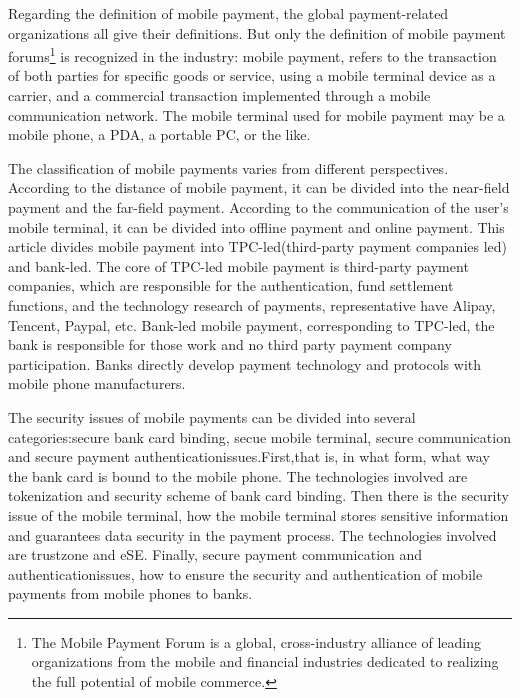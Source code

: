 \documentclass[journal]{IEEEtran}
\begin{document}
Regarding the definition of mobile payment, the global payment-related organizations all give their definitions. But only the definition of mobile payment forums\footnote{The Mobile Payment Forum is a global, cross-industry alliance of leading organizations from the mobile and financial industries dedicated to realizing the full potential of mobile commerce.} is recognized in the industry: mobile payment, refers to the transaction of both parties for specific goods or service, using a mobile terminal device as a carrier, and a commercial transaction implemented through a mobile communication network. The mobile terminal used for mobile payment may be a mobile phone, a PDA, a portable PC, or the like.

The classification of mobile payments varies from different perspectives. According to the distance of mobile payment, it can be divided into the near-field payment and the far-field payment. According to the communication of the user's mobile terminal, it can be divided into offline payment and online payment. This article divides mobile payment into TPC-led(third-party payment companies led) and bank-led. The core of TPC-led mobile payment is third-party payment companies, which are responsible for the authentication, fund settlement functions, and the technology research of payments, representative have Alipay, Tencent, Paypal, etc. Bank-led mobile payment, corresponding to TPC-led, the bank is responsible for those work and no third party payment company participation. Banks directly develop payment technology and protocols with mobile phone manufacturers.


The security issues of mobile payments can be divided into several categories:secure bank card binding, secue mobile terminal, secure communication and secure payment authenticationissues.First,that is, in what form, what way the bank card is bound to the mobile phone. The technologies involved are tokenization and security scheme of bank card binding. Then there is the security issue of the mobile terminal, how the mobile terminal stores sensitive information and guarantees data security in the payment process. The technologies involved are trustzone and eSE. Finally, secure payment  communication and authenticationissues, how to ensure the security and authentication of mobile payments from mobile phones to banks.
\end{document}
